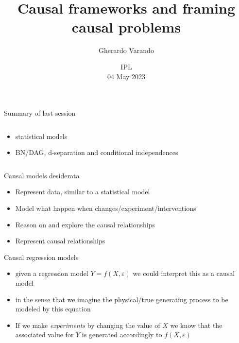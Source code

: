 \documentclass{beamer}
\institute[]{}
\title{Causal frameworks and framing causal problems}
\author{Gherardo Varando}
\date{IPL \\ 04 May 2023}
\begin{document}
\begin{frame}
	\titlepage
\end{frame}

\begin{frame}{Summary of last session}
	\begin{columns}
		\begin{column}{0.5\textwidth}
	\begin{itemize}
		\item statistical models
		\item BN/DAG, d-separation and conditional independences 
	\end{itemize}
		\end{column}
		\begin{column}{0.5\textwidth}
			
		\end{column}
	\end{columns}
\end{frame}

\begin{frame}{Causal models desiderata}
	\begin{itemize}
		\item Represent data, similar to a statistical model 
		\item Model what happen when changes/experiment/interventions  
		\item Reason on and explore the causal relationships 
		\item Represent causal relationships 
	\end{itemize}
\end{frame}

\begin{frame}{Causal regression models}
      \begin{itemize}
	      \item given a regression model $Y = f(X, \varepsilon)$ 
		      we could interpret this as a causal model 
	      \item in the sense that we imagine the physical/true generating process 
		      to be modeled by this equation 
	      \item<2-> If we make \emph{experiments} by changing the value of $X$ we know that 
		      the associated value for $Y$ is generated accordingly to $f(X, \varepsilon)$ 
      \end{itemize}
\end{frame}
\end{document}
